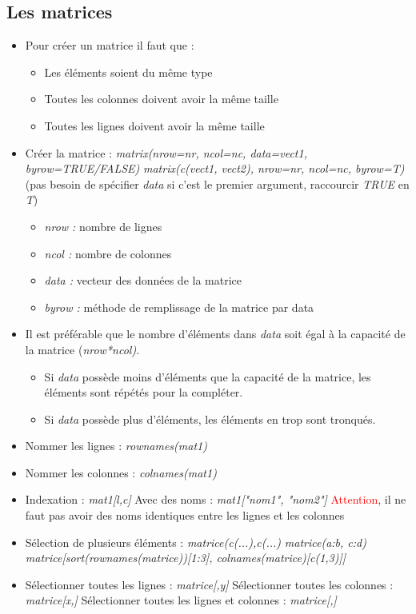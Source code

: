\documentclass[12pt,a4paper]{article}
\begin{document}
\subsection{Les matrices}
\begin{itemize}
\item Pour créer un matrice il faut que :
\begin{itemize}
\item Les éléments soient du même type
\item Toutes les colonnes doivent avoir la même taille
\item Toutes les lignes doivent avoir la même taille
\end{itemize}
\item Créer la matrice :
\newline \textit{matrix(nrow=nr, ncol=nc, data=vect1, byrow=TRUE/FALSE)}
\newline \textit{matrix(c(vect1, vect2), nrow=nr, ncol=nc, byrow=T)} (pas besoin de spécifier \textit{data} si c'est le premier argument, raccourcir \textit{TRUE} en \textit{T})
\begin{itemize}
\item \textit{nrow : } nombre de lignes
\item \textit{ncol : } nombre de colonnes
\item \textit{data : } vecteur des données de la matrice
\item \textit{byrow : } méthode de remplissage de la matrice par data
\end{itemize}
\item Il est préférable que le nombre d'éléments dans \textit{data} soit égal à la capacité de la matrice (\textit{nrow*ncol)}.
\begin{itemize}
\item Si \textit{data} possède moins d'éléments que la capacité de la matrice, les éléments sont répétés pour la compléter.
\item Si \textit{data} possède plus d'éléments, les éléments en trop sont tronqués.
\end{itemize}
\item Nommer les lignes : \textit{rownames(mat1)}
\item Nommer les colonnes : \textit{colnames(mat1)}
\item Indexation : \textit{mat1[l,c]}
\newline Avec des noms : \textit{mat1["nom1", "nom2"]}
\newline \textcolor{red}{Attention}, il ne faut pas avoir des noms identiques entre les lignes et les colonnes
\item Sélection de plusieurs éléments : \textit{matrice(c(...),c(...)}
\newline \textit{matrice(a:b, c:d)}
\newline \textit{matrice[sort(rownames(matrice))[1:3], colnames(matrice)[c(1,3)]]}
\item Sélectionner toutes les lignes : \textit{matrice[,y]}
\newline Sélectionner toutes les colonnes : \textit{matrice[x,]}
\newline Sélectionner toutes les lignes et colonnes : \textit{matrice[,]}
\end{itemize}
\end{document}
